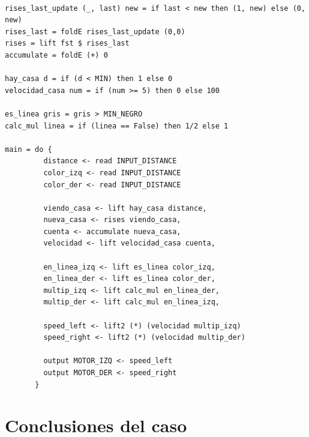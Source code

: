 \begin{verbatim}

rises_last_update (_, last) new = if last < new then (1, new) else (0, new)
rises_last = foldE rises_last_update (0,0)
rises = lift fst $ rises_last
accumulate = foldE (+) 0

hay_casa d = if (d < MIN) then 1 else 0
velocidad_casa num = if (num >= 5) then 0 else 100

es_linea gris = gris > MIN_NEGRO
calc_mul linea = if (linea == False) then 1/2 else 1

main = do {
         distance <- read INPUT_DISTANCE
         color_izq <- read INPUT_DISTANCE
         color_der <- read INPUT_DISTANCE

         viendo_casa <- lift hay_casa distance,
         nueva_casa <- rises viendo_casa,
         cuenta <- accumulate nueva_casa,
         velocidad <- lift velocidad_casa cuenta,

         en_linea_izq <- lift es_linea color_izq,
         en_linea_der <- lift es_linea color_der,
         multip_izq <- lift calc_mul en_linea_der,
         multip_der <- lift calc_mul en_linea_izq,

         speed_left <- lift2 (*) (velocidad multip_izq)
         speed_right <- lift2 (*) (velocidad multip_der)

         output MOTOR_IZQ <- speed_left
         output MOTOR_DER <- speed_right
       }

\end{verbatim}

\section {Conclusiones del caso}


